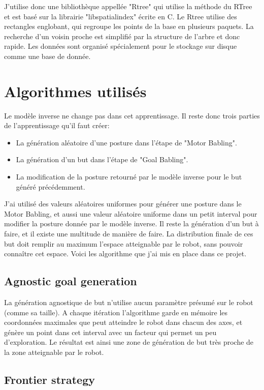 \documentclass[11pt,french]{article}
\begin{document}
J'utilise donc une bibliothèque appellée "Rtree" qui utilise la méthode du RTree et est basé sur la librairie "libspatialindex" écrite en C. Le Rtree utilise des rectangles englobant, qui regroupe les points de la base en plusieurs paquets. La recherche d'un voisin proche est simplifié par la structure de l'arbre et donc rapide. Les données sont organisé spécialement pour le stockage sur disque comme une base de donnée.

\section{Algorithmes utilisés}

Le modèle inverse ne change pas dans cet apprentissage. Il reste donc trois parties de l'apprentissage qu'il faut créer:
\begin{itemize}
    \item La génération aléatoire d'une posture dans l'étape de "Motor Babling".
    \item La génération d'un but dans l'étape de "Goal Babling".
    \item La modification de la posture retourné par le modèle inverse pour le but généré précédemment.
\end{itemize}

J'ai utilisé des valeurs aléatoires uniformes pour générer une posture dans le Motor Babling, et aussi une valeur aléatoire uniforme dans un petit interval pour modifier la posture donnée par le modèle inverse. Il reste la génération d'un but à faire, et il existe une multitude de manière de faire. La distribution finale de ces but doit remplir au maximum l'espace atteignable par le robot, sans pouvoir connaître cet espace. Voici les algorithme que j'ai mis en place dans ce projet.

\subsection{Agnostic goal generation}

La génération agnostique de but n'utilise aucun paramètre présumé sur le robot (comme sa taille). A chaque itération l'algorithme garde en mémoire les coordonnées maximales que peut atteindre le robot dans chacun des axes, et génère un point dans cet interval avec un facteur qui permet un peu d'exploration. Le résultat est ainsi une zone de génération de but très proche de la zone atteignable par le robot.

\subsection{Frontier strategy}
\end{document}
